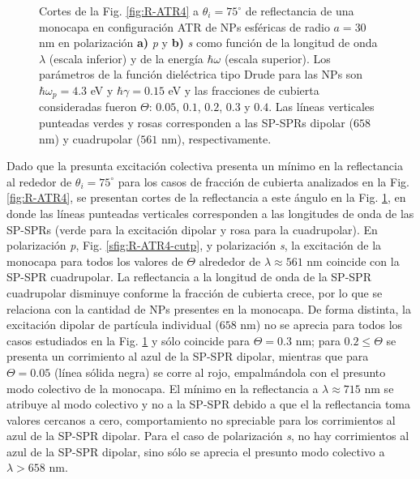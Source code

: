 \begin{figure}[h!]
	\caption{Cortes de la Fig. \ref{fig:R-ATR4} a $\theta_i = 75^\circ$ de reflectancia de una monocapa en configuración ATR de NPs esféricas de radio $a=30$ nm en polarización \textbf{a)} \emph{p} y \textbf{b)} \emph{s} como función de la longitud de onda $\lambda$ (escala inferior) y de la energía $\hbar\omega$ (escala superior). Los parámetros de la función dieléctrica tipo Drude para las NPs son $\hbar\omega_p = 4.3$ eV y $\hbar\gamma = 0.15$ eV y las fracciones de cubierta consideradas fueron $\Theta$: $0. 05$, $0. 1$, $0. 2$, $0. 3$ y $0. 4$. Las líneas verticales punteadas verdes y rosas corresponden a las SP-SPRs dipolar ($658$ nm) y cuadrupolar ($561$ nm), respectivamente. }\label{fig:R-ATR4-Cuts}
	\end{figure}	  

Dado que la presunta excitación colectiva presenta un mínimo en la reflectancia  al rededor de $\theta_i = 75^\circ$ para los casos de fracción de cubierta analizados en la Fig.  \ref{fig:R-ATR4}, se presentan cortes de la reflectancia a este ángulo en la Fig. \ref{fig:R-ATR4-Cuts}, en donde las líneas punteadas verticales corresponden a las longitudes de onda de las SP-SPRs (verde para la excitación dipolar y rosa para la cuadrupolar). En polarización \emph{p}, Fig. \ref{sfig:R-ATR4-cutp}, y polarización \emph{s}, la excitación de la monocapa para todos los valores de $\Theta$ alrededor de $\lambda \approx 561$ nm coincide con la SP-SPR cuadrupolar.  La reflectancia a la longitud de onda de la SP-SPR cuadrupolar disminuye conforme la fracción de cubierta crece, por lo que se relaciona con la cantidad de NPs presentes en la monocapa. De forma distinta, la excitación dipolar de partícula individual ($658$ nm) no se aprecia para todos los casos estudiados en la Fig. \ref{fig:R-ATR4-Cuts} y sólo coincide para $\Theta=0.3$ nm; para $0.2\leq \Theta$ se presenta un corrimiento al azul de la SP-SPR dipolar, mientras que para $\Theta=0.05$ (línea sólida negra) se corre al rojo, empalmándola con el presunto modo colectivo de la monocapa. El mínimo en la reflectancia a $\lambda\approx 715$ nm  se atribuye al modo colectivo y no a la SP-SPR debido a que el la reflectancia toma valores cercanos a cero, comportamiento no spreciable para los corrimientos al azul de la SP-SPR dipolar. Para el caso de polarización \emph{s}, no hay corrimientos al azul de la SP-SPR dipolar, sino sólo se aprecia el presunto modo colectivo a $\lambda>658$ nm.

